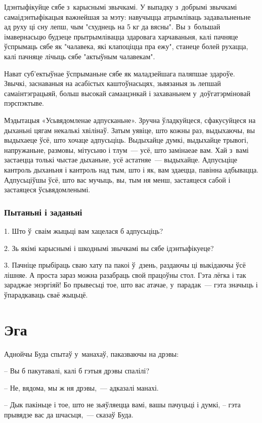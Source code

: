 Ідэнтыфікуйце сябе з~карыснымі звычкамі. У выпадку з~добрымі звычкамі самаідэнтыфікацыя важнейшая за мэту: навучыцца атрымліваць задавальненьне ад руху ці сну лепш, чым "схуднець на 5 кг да вясны". Вы з~большай імавернасьцю будзеце прытрымлівацца здаровага харчаваньня, калі пачняце ўспрымаць сябе як "чалавека, які клапоціцца пра ежу", станеце болей рухацца, калі пачняце лічыць сябе "актыўным чалавекам".

Нават суб'ектыўнае ўспрыманьне сябе як маладзейшага паляпшае здароўе. Звычкі, заснаваныя на асабістых каштоўнасьцях, зьвязаныя зь лепшай самаінтэграцыяй, больш высокай самаацэнкай і захаваньнем у~доўгатэрміновай пэрспэктыве.

Мэдытацыя «Усьвядомленае адпусканьне». Зручна ўладкуйцеся, сфакусуйцеся на дыханьні цягам некалькі хвілінаў. Затым уявіце, што кожны раз, выдыхаючы, вы выдыхаеце ўсё, што хочаце адпусьціць. Выдыхайце думкі, выдыхайце трывогі, напружаньне, размовы, мітусьню і тлум~--- усё, што замінаеае вам. Хай з~вамі застаецца толькі чыстае дыханьне, усё астатняе~--- выдыхайце. Адпусьціце кантроль дыханьня і кантроль над тым, што і як, вам здаецца, павінна адбывацца. Адпусьціўшы ўсё, што вас мучыць, вы, тым ня менш, застаяцеся сабой і застаяцеся ўсьвядомленымі.

\subsubsection{Пытаньні і заданьні}

1. Што ў~сваім жыцьці вам хацелася б адпусьціць?

2. Зь якімі карыснымі і шкоднымі звычкамі вы сябе ідэнтыфікуеце?

3. Пачніце прыбіраць сваю хату па пакоі ў~дзень, раздаючы ці выкідаючы ўсё лішняе. А проста зараз можна разабраць свой працоўны стол. Гэта лёгка і так зараджае энэргіяй! Бо прывесьці тое, што вас атачае, у~парадак~--- гэта значыць і ўпарадкаваць сваё жыцьцё.


\section{Эга}

Аднойчы Буда спытаў у~манахаў, паказваючы на дрэвы: 

– Вы б пакутавалі, калі б гэтыя дрэвы спалілі?

– Не, вядома, мы ж ня дрэвы,~--- адказалі манахі.

– Дык пакіньце і тое, што не зьяўляецца вамі, вашы пачуцьці і думкі, -- гэта прывядзе вас да шчасьця,~--- сказаў Буда.

